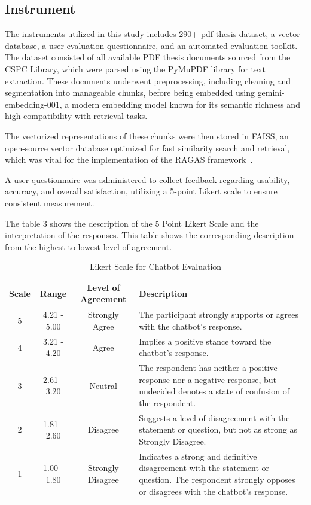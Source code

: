 \begin{refsection}
\subsection{Instrument}

The instruments utilized in this study includes 290+ pdf thesis dataset, a vector database, a user evaluation questionnaire, and an automated evaluation toolkit. The dataset consisted of all available PDF thesis documents sourced from the CSPC Library, which were parsed using the PyMuPDF library for text extraction. These documents underwent preprocessing, including cleaning and segmentation into manageable chunks, before being embedded using gemini-embedding-001, a modern embedding model known for its semantic richness and high compatibility with retrieval tasks.

The vectorized representations of these chunks were then stored in FAISS, an open-source vector database optimized for fast similarity search and retrieval, which was vital for the implementation of the RAGAS framework~\cite{trychroma2023chroma}.

A user questionnaire was administered to collect feedback regarding usability, accuracy, and overall satisfaction, utilizing a 5-point Likert scale to ensure consistent measurement.

The table 3 shows the description of the 5 Point Likert Scale and the interpretation of the responses. This table shows the corresponding description from the highest to lowest level of agreement.

\begin{table}[H]
    \centering
    \caption{Likert Scale for Chatbot Evaluation}
    \begin{tabular}{|c|c|c|m{7cm}|}
        \hline
        \textbf{Scale} & \textbf{Range} & \textbf{Level of Agreement} & \textbf{Description} \\
        \hline
                5 & 4.21 - 5.00 & Strongly Agree & The participant strongly supports or agrees with the chatbot's response.\\
        \hline
                4 & 3.21 - 4.20 & Agree & Implies a positive stance toward the chatbot's response. \\
        \hline
                3 & 2.61 - 3.20 & Neutral & The respondent has neither a positive response nor a negative response, but undecided denotes a state of confusion of the respondent. \\
        \hline
                2 & 1.81 - 2.60 & Disagree & Suggests a level of disagreement with the statement or question, but not as strong as Strongly Disagree.\\
        \hline
                1 & 1.00 - 1.80 & Strongly Disagree & Indicates a strong and definitive disagreement with the statement or question. The respondent strongly opposes or disagrees with the chatbot's response.\\
        \hline
    \end{tabular}
    \label{tab:likert}
\end{table}



\end{refsection}
